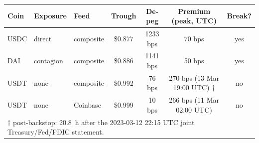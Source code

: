 \begin{tabular}{@{}lllcccc@{}}
\toprule
Coin & Exposure & Feed & Trough & De-peg & Premium (peak, UTC) & Break? \\
\midrule
USDC & direct & composite & \$0.877 & 1233 bps & 70 bps & yes \\
DAI & contagion & composite & \$0.886 & 1141 bps & 50 bps & yes \\
USDT & none & composite & \$0.992 & 76 bps & 270 bps (13 Mar 19:00 UTC) $\dagger$ & no \\
USDT & none & Coinbase & \$0.999 & 10 bps & 266 bps (11 Mar 02:00 UTC) & no \\
\bottomrule
\multicolumn{7}{p{0.93\linewidth}}{$\dagger$ post-backstop: 20.8~h after the 2023-03-12 22:15 UTC joint Treasury/Fed/FDIC statement.} \\
\end{tabular}
